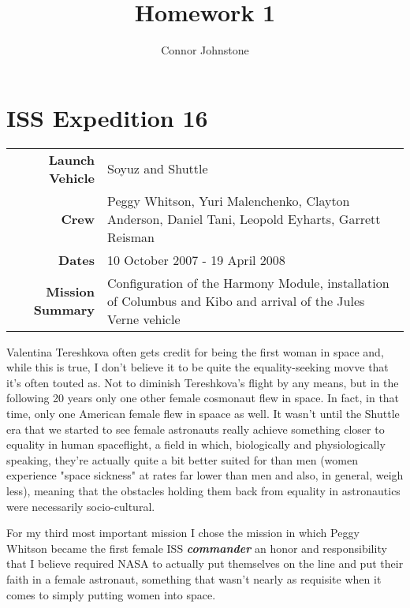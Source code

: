 \documentclass{article}
\begin{document}
  \title{Homework 1}
  \author{Connor Johnstone}

  \maketitle

  \section{ISS Expedition 16}

  \begin{center}
    \begin{tabular}{ >{\bfseries}r | p{3.5in} }
      \hline
      Launch Vehicle & Soyuz and Shuttle \\
      Crew & Peggy Whitson, 
             Yuri Malenchenko, 
             Clayton Anderson, 
             Daniel Tani,
             Leopold Eyharts, 
             Garrett Reisman \\
      Dates & 10 October 2007 - 19 April 2008 \\
      Mission Summary & Configuration of the Harmony Module, installation of
      Columbus and Kibo and arrival of the Jules Verne vehicle \\
      \hline
    \end{tabular}
  \end{center}

  Valentina Tereshkova often gets credit for being the first woman in space and,
  while this is true, I don't believe it to be quite the equality-seeking movve
  that it's often touted as. Not to diminish Tereshkova's flight by any means, but
  in the following 20 years only one other female cosmonaut flew in space.
  In fact, in that time, only one American female flew in
  spaace as well. It wasn't until the Shuttle era that we started to see female
  astronauts really achieve something closer to equality in human spaceflight,
  a field in which, biologically and physiologically speaking, they're actually
  quite a bit better suited for than men (women experience "space sickness" at
  rates far lower than men and also, in general, weigh less), meaning that the
  obstacles holding them back from equality in astronautics were necessarily
  socio-cultural.

  For my third most important mission I chose the mission in which Peggy Whitson
  became the first female ISS \textbf{\textit{commander}} an honor and responsibility that I
  believe required NASA to actually put themselves on the line and put their faith
  in a female astronaut, something that wasn't nearly as requisite when it comes 
  to simply putting women into space.
\end{document}
